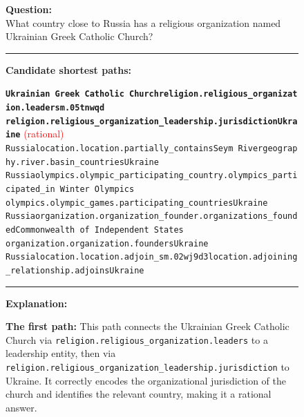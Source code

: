 \begin{figure}[t]
\begin{tcolorbox}[colback=gray!5!white,
                  colframe=gray!75!black,
                  title=WebQTrn-3763\_c707414f103503f2530fc654a85645fe]
\scriptsize

\textbf{Question:}\\
What country close to Russia has a religious organization named Ukrainian Greek Catholic Church?

\rule{\linewidth}{0.4pt}

\textbf{Candidate shortest paths:}\\[2pt]
{\raggedright
\texttt{\textbf{Ukrainian Greek Catholic Church\patharrow religion.religious\_organization.leaders\patharrow m.05tnwqd \\ \patharrow religion.religious\_organization\_leadership.jurisdiction\patharrow Ukraine}}\hfill
\textcolor{red}{(rational)}\\[6pt]

\texttt{Russia\patharrow location.location.partially\_contains\patharrow Seym River\patharrow geography.river.basin\_countries\patharrow Ukraine}\\[6pt]

\texttt{Russia\patharrow olympics.olympic\_participating\_country.olympics\_participated\_in Winter Olympics \\ \patharrow olympics.olympic\_games.participating\_countries\patharrow Ukraine}\\[6pt]

\texttt{Russia\patharrow organization.organization\_founder.organizations\_founded\patharrow Commonwealth of Independent States \\ \patharrow organization.organization.founders\patharrow Ukraine}\\[6pt]

\texttt{Russia\patharrow location.location.adjoin\_s\patharrow m.02wj9d3\patharrow location.adjoining\_relationship.adjoins\patharrow Ukraine}\\[6pt]

\par}

\rule{\linewidth}{0.4pt}

\textbf{Explanation:}\\[2pt]
{\raggedright
\textbf{The first path:} This path connects the Ukrainian Greek Catholic Church via \texttt{religion.religious\_organization.leaders} to a leadership entity, then via \texttt{religion.religious\_organization\_leadership.jurisdiction} to Ukraine. It correctly encodes the organizational jurisdiction of the church and identifies the relevant country, making it a rational answer.\par\vspace{6pt}

}
\end{tcolorbox}
\end{figure}
